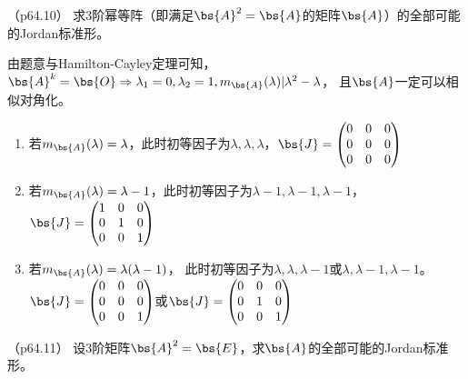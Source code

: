 \documentclass[12pt, a4paper, oneside, UTF8]{ctexbook}
\begin{document}
\begin{question}（p64.10）
    求$3$阶幂等阵（即满足$\bs{A}^2=\bs{A}$的矩阵$\bs{A}$）的全部可能的Jordan标准形。
\end{question}

\begin{solution}
    由题意与Hamilton-Cayley定理可知，$\bs{A}^k=\bs{O} \Rightarrow \lambda_1=0,\lambda_2=1,m_{\bs{A}}(\lambda)|\lambda^2-\lambda$，
    且$\bs{A}$一定可以相似对角化。
    \begin{enumerate}[label=(\arabic*)]
        \item 若$m_{\bs{A}}(\lambda)=\lambda$，此时初等因子为$\lambda,\lambda,\lambda$，$\bs{J}=\begin{pmatrix}
            0 &0 &0\\
            0 &0 &0\\
            0 &0 &0
        \end{pmatrix}$
        \item 若$m_{\bs{A}}(\lambda)=\lambda-1$，此时初等因子为$\lambda-1,\lambda-1,\lambda-1$，$\bs{J}=\begin{pmatrix}
            1 &0 &0\\
            0 &1 &0\\
            0 &0 &1
        \end{pmatrix}$
        \item 若$m_{\bs{A}}(\lambda)=\lambda(\lambda-1)$，
        此时初等因子为$\lambda,\lambda,\lambda-1$或$\lambda,\lambda-1,\lambda-1$。$\bs{J}=\begin{pmatrix}
        0 &0 &0\\
        0 &0 &0\\
        0 &0 &1
    \end{pmatrix}$或$\bs{J}=\begin{pmatrix}
        0 &0 &0\\
        0 &1 &0\\
        0 &0 &1
    \end{pmatrix}$
    \end{enumerate}
\end{solution}


\begin{question}（p64.11）
    设$3$阶矩阵$\bs{A}^2=\bs{E}$，求$\bs{A}$的全部可能的Jordan标准形。
\end{question}
\end{document}
